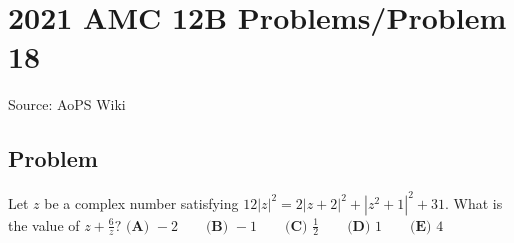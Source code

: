 \documentclass[12pt]{article}
\begin{document}
\section*{{2021 AMC 12B Problems/Problem 18}}
Source: AoPS Wiki

\subsection*{Problem}
Let $z$ be a complex number satisfying $12|z|^2=2|z+2|^2+|z^2+1|^2+31.$ What is the value of $z+\frac 6z?$ $\textbf{(A) }-2 \qquad \textbf{(B) }-1 \qquad \textbf{(C) }\frac12\qquad \textbf{(D) }1 \qquad \textbf{(E) }4$
\end{document}
